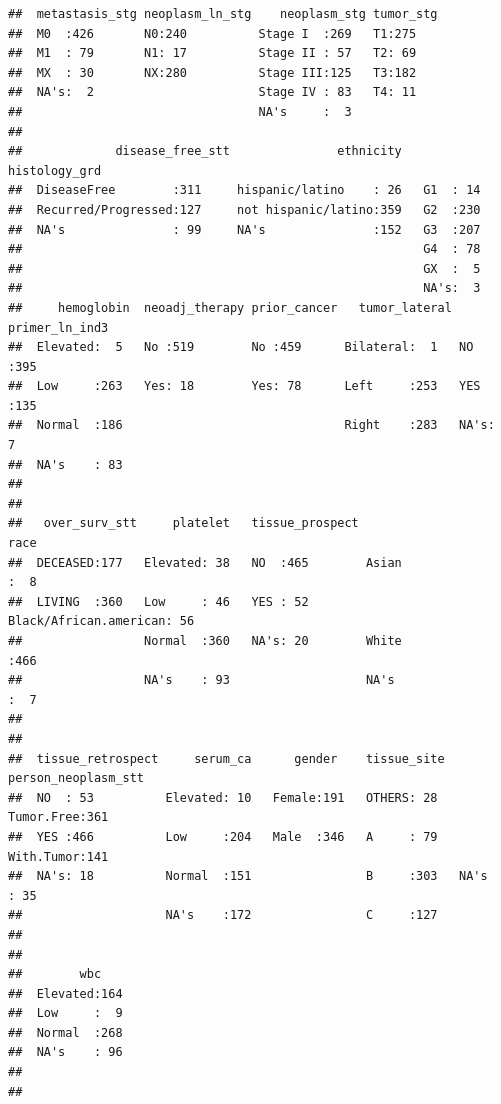 \documentclass[]{article}
\begin{document}
\begin{verbatim}
##  metastasis_stg neoplasm_ln_stg    neoplasm_stg tumor_stg
##  M0  :426       N0:240          Stage I  :269   T1:275   
##  M1  : 79       N1: 17          Stage II : 57   T2: 69   
##  MX  : 30       NX:280          Stage III:125   T3:182   
##  NA's:  2                       Stage IV : 83   T4: 11   
##                                 NA's     :  3            
##                                                          
##             disease_free_stt               ethnicity   histology_grd
##  DiseaseFree        :311     hispanic/latino    : 26   G1  : 14     
##  Recurred/Progressed:127     not hispanic/latino:359   G2  :230     
##  NA's               : 99     NA's               :152   G3  :207     
##                                                        G4  : 78     
##                                                        GX  :  5     
##                                                        NA's:  3     
##     hemoglobin  neoadj_therapy prior_cancer   tumor_lateral primer_ln_ind3
##  Elevated:  5   No :519        No :459      Bilateral:  1   NO  :395      
##  Low     :263   Yes: 18        Yes: 78      Left     :253   YES :135      
##  Normal  :186                               Right    :283   NA's:  7      
##  NA's    : 83                                                             
##                                                                           
##                                                                           
##   over_surv_stt     platelet   tissue_prospect                     race    
##  DECEASED:177   Elevated: 38   NO  :465        Asian                 :  8  
##  LIVING  :360   Low     : 46   YES : 52        Black/African.american: 56  
##                 Normal  :360   NA's: 20        White                 :466  
##                 NA's    : 93                   NA's                  :  7  
##                                                                            
##                                                                            
##  tissue_retrospect     serum_ca      gender    tissue_site  person_neoplasm_stt
##  NO  : 53          Elevated: 10   Female:191   OTHERS: 28   Tumor.Free:361     
##  YES :466          Low     :204   Male  :346   A     : 79   With.Tumor:141     
##  NA's: 18          Normal  :151                B     :303   NA's      : 35     
##                    NA's    :172                C     :127                      
##                                                                                
##                                                                                
##        wbc     
##  Elevated:164  
##  Low     :  9  
##  Normal  :268  
##  NA's    : 96  
##                
## 
\end{verbatim}
\end{document}
